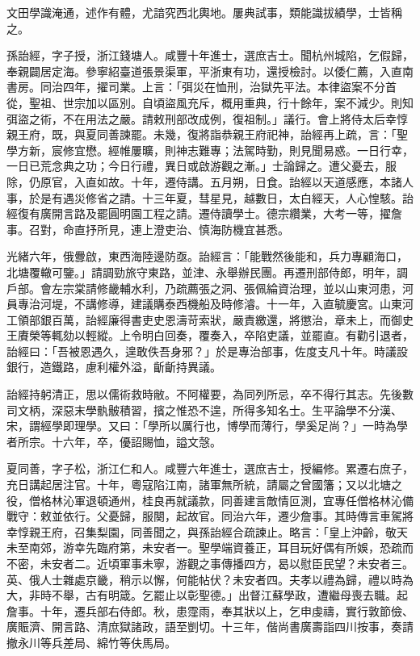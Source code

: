 \begin{pinyinscope}
文田學識淹通，述作有體，尤諳究西北輿地。屢典試事，類能識拔績學，士皆稱之。

孫詒經，字子授，浙江錢塘人。咸豐十年進士，選庶吉士。聞杭州城陷，乞假歸，奉親闢居定海。參寧紹臺道張景渠軍，平浙東有功，還授檢討。以倭仁薦，入直南書房。同治四年，擢司業。上言：「弭災在恤刑，治獄先平法。本律盜案不分首從，聖祖、世宗加以區別。自頃盜風充斥，概用重典，行十餘年，案不減少。則知弭盜之術，不在用法之嚴。請敕刑部改成例，復祖制。」議行。會上將侍太后幸惇親王府，既，與夏同善諫罷。未幾，復將詣恭親王府祀神，詒經再上疏，言：「聖學方新，宸修宜懋。經帷屢曠，則神志難專；法駕時勤，則見聞易惑。一日行幸，一日已荒念典之功；今日行禮，異日或啟游觀之漸。」士論歸之。遭父憂去，服除，仍原官，入直如故。十年，遷侍講。五月朔，日食。詒經以天道感應，本諸人事，於是有遇災修省之請。十三年夏，彗星見，越數日，太白經天，人心惶駭。詒經復有廣開言路及罷圓明園工程之請。遷侍讀學士。德宗纘業，大考一等，擢詹事。召對，命直抒所見，連上澄吏治、慎海防機宜甚悉。

光緒六年，俄釁啟，東西海陸邊防亟。詒經言：「能戰然後能和，兵力專顧海口，北塘覆轍可鑒。」請調勁旅守東路，並津、永舉辦民團。再遷刑部侍郎，明年，調戶部。會左宗棠請修畿輔水利，乃疏薦張之洞、張佩綸資治理，並以山東河患，河員專治河堤，不講修導，建議購泰西機船及時修濬。十一年，入直毓慶宮。山東河工領部銀百萬，詒經廉得書吏史恩濤苛索狀，嚴責繳還，將懲治，章未上，而御史王賡榮等輒劾以輕縱。上令明白回奏，覆奏入，卒陷吏議，並罷直。有勸引退者，詒經曰：「吾被恩遇久，遑敢佚吾身邪？」於是專治部事，佐度支凡十年。時議設銀行，造鐵路，慮利權外溢，齗齗持異議。

詒經持躬清正，思以儒術救時敝。不阿權要，為同列所忌，卒不得行其志。先後數司文柄，深惡末學骫骳積習，擯之惟恐不遑，所得多知名士。生平論學不分漢、宋，謂經學即理學。又曰：「學所以厲行也，博學而薄行，學奚足尚？」一時為學者所宗。十六年，卒，優詔賜恤，謚文愨。

夏同善，字子松，浙江仁和人。咸豐六年進士，選庶吉士，授編修。累遷右庶子，充日講起居注官。十年，粵寇陷江南，諸軍無所統，請屬之曾國籓；又以北塘之役，僧格林沁軍退頓通州，桂良再就議款，同善建言敵情叵測，宜專任僧格林沁備戰守：敕並依行。父憂歸，服闋，起故官。同治六年，遷少詹事。其時傳言車駕將幸惇親王府，召集梨園，同善聞之，與孫詒經合疏諫止。略言：「皇上沖齡，敬天未至南郊，游幸先臨府第，未安者一。聖學端資養正，耳目玩好偶有所娛，恐疏而不密，未安者二。近頃軍事未寧，游觀之事傳播四方，曷以慰臣民望？未安者三。英、俄人士雜處京畿，稍示以懈，何能帖伏？未安者四。夫孝以禮為歸，禮以時為大，非時不舉，古有明箴。乞罷止以彰聖德。」出督江蘇學政，遭繼母喪去職。起詹事。十年，遷兵部右侍郎。秋，患霪雨，奉其狀以上，乞申虔禱，實行敦節儉、廣賑濟、開言路、清庶獄諸政，語至剴切。十三年，偕尚書廣壽詣四川按事，奏請撤永川等兵差局、綿竹等伕馬局。


\end{pinyinscope}
